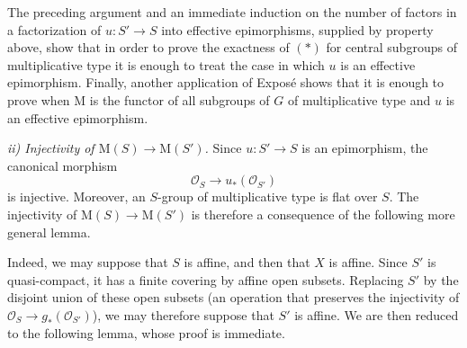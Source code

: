 The preceding argument and an immediate induction on the number of
factors in a factorization of \(u:S'\to S\) into effective
epimorphisms, supplied by property \textup{} above, show that in
order to prove the exactness of \((*)\) for central subgroups of
multiplicative type it is enough to treat the case in which \(u\)
is an effective epimorphism. Finally, another application of
Exposé  shows that it is enough to prove  when
\(\mathrm M\) is the functor of all subgroups of \(G\) of
multiplicative type and \(u\) is an effective epimorphism.

\smallskip
\noindent\textit{ii) Injectivity of
\(\mathrm M(S)\to\mathrm M(S')\).}\quad
Since \(u:S'\to S\) is an epimorphism, the canonical morphism
\[
  \mathcal O_S\longrightarrow u_*(\mathcal O_{S'})
\]
is injective. Moreover, an \(S\)-group of multiplicative type is
flat over \(S\). The injectivity of
\(\mathrm M(S)\to\mathrm M(S')\) is therefore a consequence of the
following more general lemma.


Indeed, we may suppose that \(S\) is affine, and then that \(X\) is
affine. Since \(S'\) is quasi-compact, it has a finite covering by
affine open subsets. Replacing \(S'\) by the disjoint union of these
open subsets (an operation that preserves the injectivity of
\(\mathcal O_S\to g_*(\mathcal O_{S'})\)), we may therefore suppose
that \(S'\) is affine. We are
then reduced to the following lemma, whose proof is immediate.

